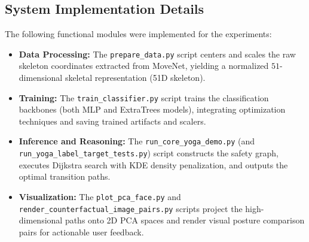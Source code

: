 \documentclass[pdflatex,sn-mathphys-num]{sn-jnl}%
\theoremstyle{thmstyleone}%
\theoremstyle{thmstyletwo}%
\theoremstyle{thmstylethree}%
\begin{document}
\begin{appendices}
\section{System Implementation Details}\label{sec:appendix}
The following functional modules were implemented for the experiments:
\begin{itemize}
    \item \textbf{Data Processing:} The \texttt{prepare\_data.py} script centers and scales the raw skeleton coordinates extracted from MoveNet, yielding a normalized $51$-dimensional skeletal representation (51D skeleton).
    \item \textbf{Training:} The \texttt{train\_classifier.py} script trains the classification backbones (both MLP and ExtraTrees models), integrating optimization techniques and saving trained artifacts and scalers.
    \item \textbf{Inference and Reasoning:} The \texttt{run\_core\_yoga\_demo.py} (and \texttt{run\_yoga_label_target_tests.py}) script constructs the safety graph, executes Dijkstra search with KDE density penalization, and outputs the optimal transition paths.
    \item \textbf{Visualization:} The \texttt{plot\_pca\_face.py} and \texttt{render\_counterfactual\_image\_pairs.py} scripts project the high-dimensional paths onto 2D PCA spaces and render visual posture comparison pairs for actionable user feedback.
\end{itemize}
\end{appendices}

\end{document}
